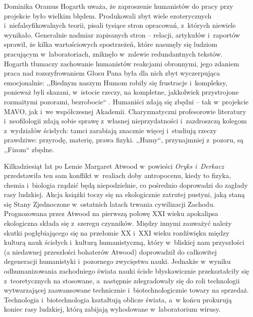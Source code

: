 \begin{artplenv}{Dominika Oramus}
Hogarth uważa, że zaproszenie humanistów do pracy przy projekcie było wielkim błędem. Produkowali zbyt wiele ezoterycznych i~niefalsyfikowalnych teorii, pisali tysiące stron opracowań, z~których niewiele wynikało. Generalnie nadmiar zapisanych stron -- relacji, artykułów i~raportów sprawił, że kilka wartościowych spostrzeżeń, które nasunęły się ludziom pracującym w~laboratoriach, zniknęło w~zalewie redundantnych tekstów. Hogarth tłumaczy zachowanie humanistów reakcjami obronnymi, jego zdaniem praca nad rozszyfrowaniem Głosu Pana była dla nich zbyt wyczerpująca emocjonalnie: ,,Biednym naszym Humom robiły się frustracje i~kompleksy, ponieważ byli skazani, w~istocie rzeczy, na kompletne, jakkolwiek przystrojone rozmaitymi pozorami, bezrobocie``
\parencite[][s.~85]{lem_glos_2002}. %
 Humaniści zdają się zbędni -- tak w~projekcie MAVO, jak i~we współczesnej Akademii. Charyzmatyczni profesorowie literatury i~neofilologii zdają sobie sprawę z~własnej nieprzydatności i~zazdroszczą kolegom z~wydziałów ścisłych: tamci zarabiają znacznie więcej i~studiują rzeczy prawdziwe: przyrodę, materię, prawa fizyki. ,,Humy``, przynajmniej z~pozoru, są ,,Fizom`` zbędne.

Kilkadziesiąt lat po Lemie Margaret Atwood w~powieści \textit{Oryks i~Derkacz}
\parencite*[][]{atwood_oryks_2004} %
 przedstawiła ten sam konflikt w~realiach doby antropocenu, kiedy to fizyka, chemia i~biologia rządzić będą niepodzielnie, co pośrednio doprowadzi do zagłady rasy ludzkiej. Akcja książki toczy się na ekologicznie zatrutej pustyni, jaką staną się Stany Zjednoczone w~ostatnich latach trwania cywilizacji Zachodu. Prognozowana przez Atwood na pierwszą połowę XXI wieku apokalipsa ekologiczna składa się z~szeregu czynników. Między innymi zauważyć należy skutki pogłębiającego się na przełomie XX i~XXI wieku rozdźwięku między kulturą nauk ścisłych i~kulturą humanistyczną, który w~bliskiej nam przyszłości (a niedawnej przeszłości bohaterów Atwood) doprowadził do całkowitej degeneracji humanistyki i~pozornego zwycięstwa nauki. Jednakże w~wyniku odhumanizowania zachodniego świata nauki ścisłe błyskawicznie przekształciły się z~teoretycznych na stosowane, a~następnie zdegradowały się do roli technologii wytwarzającej zaawansowane technicznie i~biotechnologicznie towary na sprzedaż. Technologia i~biotechnologia kształtują oblicze świata, a~w końcu prokurują koniec rasy ludzkiej, którą zabijają wyhodowane w~laboratorium wirusy.


\end{artplenv}
